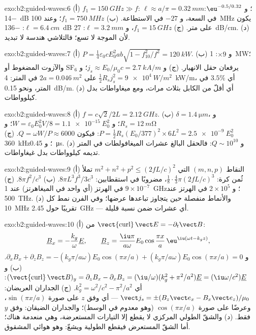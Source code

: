 \begin{solution}{exo:b2:guided-waves:6}
(أ) $f_1 = \qty{150}{GHz} \gg f$: $\ell \approx a/\pi = \qty{0.32}{mm}$؛ و $\eu^{-0.5/0.32}$:
\qty{-14}{dB} في السعة، و $-27$ في الاستطاعة. (ب) $f_1 = \qty{750}{MHz}$؛ وعند \qty{100}{MHz}
يكون $\ell = \qty{6.4}{cm}$: \qty{-136}{dB} على متر. (ج) $f_1 = \qty{15}{GHz}$، و $\ell =
\qty{3.2}{mm}$: \qty{27}{dB/cm}. (د) لأن الموجة لا تسع؛ فالتلاشي
هندسة لا تبديد.
\end{solution}

\begin{solution}{exo:b2:guided-waves:7}
(أ) $P = \tfrac14\varepsilon_0cE_0^2ab\sqrt{1 - f_{10}^2/f^2} = \qty{120}{kW}$. (ب) و $\times9$:
\qty{1}{MW}؛ والآزوت المضغوط أو SF$_6$ يرفعان حقل الانهيار. (ج)
و $j_s \approx E_0/\mu_0c = \qty{2.7}{kA/m}$؛ و $\tfrac12R_sj_s^2 = \qty{9e4}{W/m^2}$ على $2a =
\qty{0.046}{m^2}$ في المتر: \qty{4}{kW/m}، أي $3.5\%$ في المتر، ونحو \qty{0.15}{dB/m}.
(د) أي أقلّ من الكابل بثلاث مرات، ومع ميغاواطات بدل
كيلوواطات.
\end{solution}

\begin{solution}{exo:b2:guided-waves:8}
(أ) $f = c\sqrt2/2L = \qty{2.12}{GHz}$. (ب) $\delta = \qty{1.4}{\micro m}$، و $R_s = \qty{12}{m\ohm}$؛
و $W = \varepsilon_0E_0^2V/8 = \qty{1.1e-15}{}E_0^2$؛ و $P = \tfrac12R_s(E_0/377)^2 \times 6L^2 =
\qty{2.5e-9}{}E_0^2$: فيكون $Q = \omega W/P \approx 6000$. (ج) \qty{360}{kHz}؛ و \qty{0.45}{\micro s}. (د)
و $Q \sim 10^{10}$: فالحقل البالغ عشرات الميغافولطات في المتر تديمه
كيلوواطات بدل غيغاواطات.
\end{solution}

\begin{solution}{exo:b2:guided-waves:9}
(أ) النقاط $(m, n, p)$ التي $m^2 + n^2 + p^2 \le (2fL/c)^2$ تملأ ثُمن
كرة: $\tfrac18\cdot\tfrac43\pi(2fL/c)^3$، مضروبًا في استقطابين:
$8\pi L^3f^3/3c^3$. (ب) $8\pi f^2/c^3$. (ج) $9 \times 10^{-7}$ في الهرتز (أي واحد في
الميغاهرتز) عند \qty{1}{GHz}؛ و $2 \times 10^5$ في الهرتز عند \qty{500}{THz}. (د) والأنماط
منفصلة حين يتجاوز تباعدها عرضها؛ وفي الفرن نمط
كل \qty{10}{MHz} تقريبًا حول \qty{2.45}{GHz} --- أي عشرات ضمن نسبة
قليلة.
\end{solution}

\begin{solution}{exo:b2:guided-waves:10}
(أ) من $\operatorname{\vect{curl}}\vect E = -\partial_t\vect B$:
\[
\underline B_x = -\frac{k_g}\omega\underline E , \qquad
\underline B_z = \frac{\iu\pi}{a\omega}E_0\cos\frac{\pi x}a\,\eu^{\iu(\omega t - k_gz)} ,
\]
و $\partial_xB_x + \partial_zB_z = -(k_g\pi/a\omega)E_0\cos(\pi x/a) + (k_g\pi/a\omega)E_0
\cos(\pi x/a) = 0$. (ب) و $(\operatorname{\vect{curl}}\vect B)_y = \partial_zB_x - \partial_xB_z =
(\iu/\omega)(k_g^2 + \pi^2/a^2)\underline E = (\iu\omega/c^2)\underline E$: أي $k_g^2 = \omega^2/c^2 - \pi^2/a^2$.
(ج) الجداران العريضان: $\vect j_s = \pm(B_z\vect e_x - B_x\vect e_z)/\mu_0$ --- أي وفق $z$
على صورة $\sin(\pi x/a)$، وعرضًا على صورة $\cos(\pi x/a)$ (وهو معدوم في الوسط)؛ والجداران
الضيقان: وفق $y$ فقط. (د) والشقّ الطولي المركزي لا يقطع إلا
التيارات المستعرضة، وهي منعدمة هناك؛ أما الشقّ المستعرض فيقطع
الطولية ويشعّ: وهو هوائي  المشقوق.
\end{solution}

